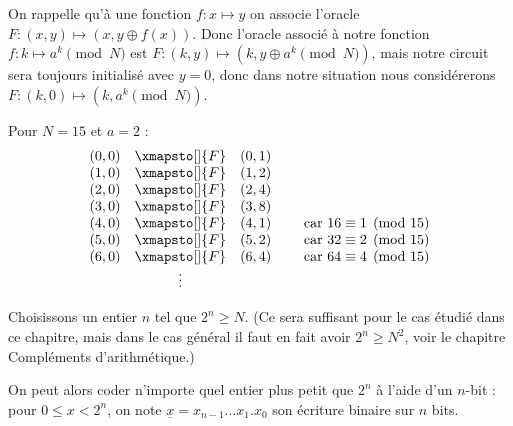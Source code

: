 \documentclass[11pt,class=report,crop=false]{standalone}
\begin{document}
On rappelle qu'à une fonction $f : x \mapsto y$ on associe l'oracle $F : (x,y) \mapsto (x, y \oplus f(x))$. Donc l'oracle associé à notre fonction $f : k \mapsto a^k \pmod N$ est
$F : (k,y) \mapsto (k, y \oplus a^k \pmod N)$, mais notre circuit sera toujours initialisé avec $y=0$, donc dans notre situation nous considérerons $F : (k,0) \mapsto (k, a^k \pmod N)$.



\begin{exemple}
Pour $N=15$ et $a=2$ :
$$\begin{array}{rcl}
(0,0) & \xmapsto[]{F}& (0,1) \\
(1,0) & \xmapsto[]{F}& (1,2) \\
(2,0) & \xmapsto[]{F}& (2,4) \\
(3,0) & \xmapsto[]{F}& (3,8) \\
(4,0) & \xmapsto[]{F}& (4,1) \qquad \text{ car } 16 \equiv 1 \pmod{15} \\
(5,0) & \xmapsto[]{F}& (5,2) \qquad \text{ car } 32 \equiv 2 \pmod{15} \\
(6,0) & \xmapsto[]{F}& (6,4) \qquad \text{ car } 64 \equiv 4 \pmod{15} \\
& \vdots  & \\
\end{array}$$
\end{exemple}


Choisissons un entier $n$ tel que $2^n \ge N$. (Ce sera suffisant pour le cas étudié dans ce chapitre, mais dans le cas général il faut en fait avoir $2^n \ge N^2$, voir le chapitre \og{}Compléments d'arithmétique\fg{}.) 


On peut alors coder n'importe quel entier plus petit que $2^n$ à l'aide d'un  $n$-bit :
pour $0 \le x < 2^n$, on note $\underline{x} = x_{n-1}\ldots x_1.x_0$ son écriture binaire sur $n$ bits.
\end{document}
